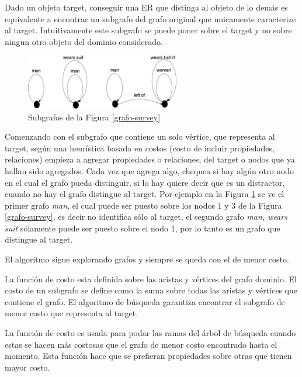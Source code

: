 Dado un objeto target, conseguir una ER que distinga al objeto de lo dem\'as es equivalente a encontrar un subgrafo del grafo original que unicamente caracterize al target. Intuitivamente este subgrafo se puede poner sobre el target y no sobre ningun otro objeto del dominio considerado.\\

\begin{figure}[ht]
\centering
\includegraphics[width=0.6\textwidth]{images/ref-exp-graph.png}
\caption{Subgrafos de la Figura \ref{grafo-survey}}
\label{ref-exp-graph}
\end{figure}

Comenzando con el subgrafo que contiene un solo v\'ertice, que representa al target, seg\'un una heur\'{i}stica basada en costos (costo de incluir propiedades, relaciones) empieza a agregar propiedades o relaciones, del target o nodos que ya hallan sido agregados. Cada vez que agrega algo, chequea si hay alg\'un otro nodo en el cual el grafo pueda distinguir, si lo hay quiere decir que es un distractor, cuando no hay el grafo distingue al target. Por ejemplo en la Figura \ref{ref-exp-graph} se ve el primer grafo {\it man}, el cual puede ser puesto sobre los nodos 1 y 3 de la Figura \ref{grafo-survey}, es decir no identifica s\'olo al target, el segundo grafo {\it man, wears suit} s\'olamente puede ser puesto sobre el nodo 1, por lo tanto es un grafo que distingue al target.  

El algoritmo sigue explorando grafos y siempre se queda con el de menor costo.

La funci\'on de costo esta definida sobre las aristas y v\'ertices del grafo dominio. El costo de un subgrafo se define como la suma sobre todas las aristas y v\'ertices que contiene el grafo.
El algoritmo de b\'usqueda garantiza encontrar el subgrafo de menor costo que representa al target.

La funci\'on de costo es usada para podar las ramas del \'arbol de b\'usqueda cuando estas se hacen m\'as costosas que el grafo de menor costo encontrado hasta el momento. Esta funci\'on hace que se prefieran propiedades sobre otras que tienen mayor costo.

